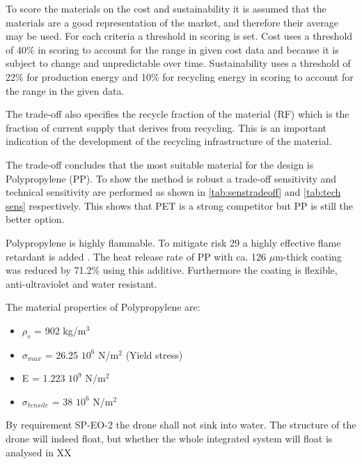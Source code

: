 To score the materials on the cost and sustainability it is assumed that the materials are a good representation of the market, and therefore their average may be used. For each criteria a threshold in scoring is set. Cost uses a threshold of 40\% in scoring to account for the range in given cost data and because it is subject to change and unpredictable over time. Sustainability uses a threshold of 22\% for production energy and 10\% for recycling energy in scoring to account for the range in the given data.

The trade-off also specifies the recycle fraction of the material (RF) which is the fraction of current supply that derives from recycling. This is an important indication of the development of the recycling infrastructure of the material.

The trade-off concludes that the most suitable material for the design is Polypropylene (PP). To show the method is robust a trade-off sensitivity and technical sensitivity are performed as shown in \autoref{tab:senstradeoff} and \autoref{tab:tech sens} respectively. This shows that PET is a strong competitor but PP is still the better option.

Polypropylene is highly flammable. To mitigate risk 29 a highly effective flame retardant is added \cite{flame}. The heat release rate of PP with ca. 126 $\mu$m-thick coating was reduced by 71.2\% using this additive. Furthermore the coating is flexible, anti-ultraviolet and water resistant.

The material properties of Polypropylene are:
\begin{itemize}[noitemsep,nolistsep]
    \item $\rho_s$ = 902 kg/m$^3$
    \item $\sigma_{max}$ = 26.25 \cdot $10^6$ N/m$^2$ (Yield stress)
    \item E = 1.223 \cdot $10^9$ N/m$^2$ 
    \item $\sigma_{tensile}$ = 38 \cdot $10^6$ N/m$^2$
\end{itemize}

By requirement SP-EO-2 the drone shall not sink into water. The structure of the drone will indeed float\cite{materialfloat}, but whether the whole integrated system will float is analysed in XX

